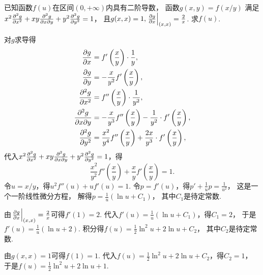 \begin{example}
已知函数\(f(u)\)在区间\((0,+\infty)\)内具有二阶导数，
函数\(g(x,y) = f(x/y)\)
满足\(x^2 \pdv[2]{g}{x} + xy \pdv[2]{g}{x}{y} + y^2 \pdv[2]{g}{y} = 1\)，
且\(g(x,x) = 1,
\eval{\pdv{g}{x}}_{(x,x)} = \frac2x\).
求\(f(u)\).
\begin{solution}
对\(g\)求导得\begin{align*}
	\pdv{g}{x} &= f'\left( \frac{x}{y} \right) \cdot \frac1y, \\
	\pdv{g}{y} &= -\frac{x}{y^2} f'\left( \frac{x}{y} \right), \\
	\pdv[2]{g}{x} &= f''\left( \frac{x}{y} \right) \cdot \frac1{y^2}, \\
	\pdv[2]{g}{x}{y} &= -\frac{x}{y^3} f''\left( \frac{x}{y} \right) - \frac1{y^2} \cdot f'\left( \frac{x}{y} \right), \\
	\pdv[2]{g}{y} &= \frac{x^2}{y^4} f''\left( \frac{x}{y} \right) + \frac{2x}{y^3} \cdot f'\left( \frac{x}{y} \right),
\end{align*}
代入\(x^2 \pdv[2]{g}{x} + xy \pdv[2]{g}{x}{y} + y^2 \pdv[2]{g}{y} = 1\)，得\begin{equation*}
	\frac{x^2}{y^2} f''(\frac{x}{y}) + \frac{x}{y} f'\left( \frac{x}{y} \right) = 1.
\end{equation*}
令\(u=x/y\)，得\(u^2 f''(u) + u f'(u) = 1\).
令\(p=f'(u)\)，得\(p' + \frac1u p = \frac1{u^2}\)，
这是一个一阶线性微分方程，
解得\(p = \frac1u (\ln u + C_1)\)，
其中\(C_1\)是待定常数.

由\(\eval{\pdv{g}{x}}_{(x,x)} = \frac2x\)可得\(f'(1)=2\).
代入\(f'(u) = \frac1u (\ln u + C_1)\)，得\(C_1=2\)，
于是\(f'(u) = \frac1u (\ln u + 2)\).
积分得\(f(u) = \frac12 \ln^2 u + 2 \ln u + C_2\)，
其中\(C_2\)是待定常数.

由\(g(x,x) = 1\)可得\(f(1)=1\).
代入\(f(u) = \frac12 \ln^2 u + 2 \ln u + C_2\)，得\(C_2=1\)，
于是\(f(u) = \frac12 \ln^2 u + 2 \ln u + 1\).
\end{solution}
\end{example}
